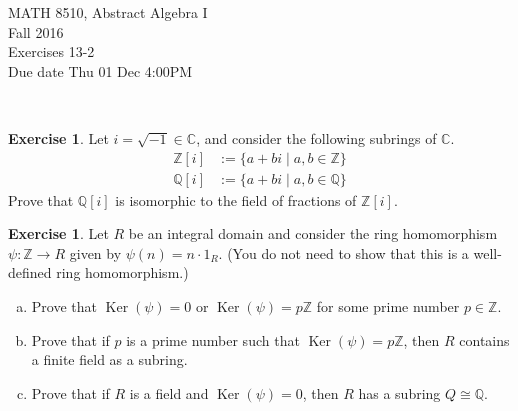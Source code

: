 \documentclass{amsart}
\newcommand{\bbc}{\mathbb{C}}
\newcommand{\bbz}{\mathbb{Z}}
\newcommand{\bbq}{\mathbb{Q}}
\renewcommand{\ker}{\operatorname{Ker}}
\theoremstyle{plain}
\theoremstyle{definition}
\newtheorem{exer}[lem]{Exercise}
\begin{document}
\noindent MATH 8510, Abstract Algebra I \\
Fall 2016\\
Exercises 13-2\\
Due date Thu 01 Dec 4:00PM

\



\begin{exer}
Let $i=\sqrt{-1}\in\bbc$, and consider the following subrings of $\bbc$.
\begin{align*}
\bbz[i]&:=\{a+bi\mid a,b\in\bbz\}
\\
\bbq[i]&:=\{a+bi\mid a,b\in\bbq\}
\end{align*}
Prove that $\bbq[i]$ is isomorphic to the field of fractions of $\bbz[i]$.
\end{exer}

\begin{exer}
Let $R$ be an integral domain and consider the ring homomorphism $\psi\colon\bbz\to R$ given by $\psi(n)=n\cdot 1_R$.
(You do not need to show that this is a well-defined ring homomorphism.)
\begin{enumerate}[(a)]
\item Prove that $\ker(\psi)=0$ or $\ker(\psi)=p\bbz$ for some prime number $p\in\bbz$.
\item Prove that if $p$ is a prime number such that $\ker(\psi)=p\bbz$, then $R$ contains a finite field as a subring.
\item Prove that if $R$ is a field and $\ker(\psi)=0$, then $R$ has a subring $Q\cong\bbq$.
\end{enumerate}
\end{exer}
\end{document}
